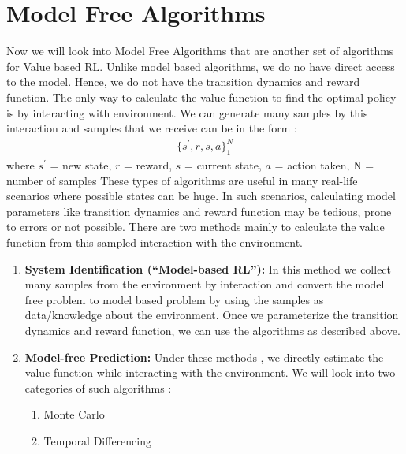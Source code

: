 \documentclass[11pt]{article}
\begin{document}
\section{Model Free Algorithms}
Now we will look into Model Free Algorithms that are another set of algorithms for Value based RL. Unlike model based algorithms, we do no have direct access to the model. Hence, we do not have the transition dynamics and reward function. The only way to calculate the value function to find the optimal policy is by interacting with environment. We can generate many samples by this interaction and samples that we receive can be in the form :
\begin{align}
    \{s^{'}, r, s, a\}_{1}^N
\end{align}
where \(s^{'}\) = new state, \(r\) = reward, \(s\) = current state, \(a\) = action taken, N = number of samples
These types of algorithms are useful in many real-life scenarios where possible states can be huge. In such scenarios, calculating model parameters like transition dynamics and reward function may be tedious, prone to errors or not possible. 
There are two methods mainly to calculate the value function from this sampled interaction with the environment.
\begin{enumerate}
    \item \textbf{System Identification (“Model-based RL”):} In this method we collect many samples from the environment by interaction and convert the model free problem to model based problem by using the samples as data/knowledge about the environment. Once we parameterize the transition dynamics and reward function, we can use the algorithms as described above.
    \item \textbf{Model-free Prediction:} Under these methods , we directly estimate the value function while interacting with the environment. We will look into two categories of such algorithms :
        \begin{enumerate}
            \item Monte Carlo
            \item Temporal Differencing
        \end{enumerate}
\end{enumerate}
\end{document}
